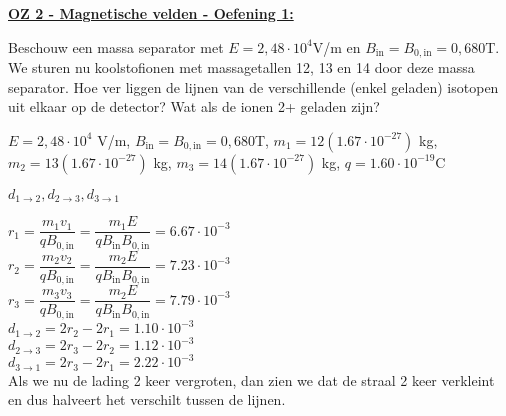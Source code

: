 \textbf{\underline{OZ 2 - Magnetische velden - Oefening 1:}}
\vspace{0.5cm}

Beschouw een massa separator met $E = 2, 48 \cdot 10^{4} $V/m en $B_{\text{in}} = B_{0,\text{in}} = 0,680 $T. We sturen nu koolstofionen met massagetallen 12, 13 en 14 door deze massa separator. Hoe ver liggen de lijnen van de verschillende (enkel geladen) isotopen uit elkaar op de detector? Wat als de ionen 2+ geladen zijn?

\begin{description}[labelwidth=1.5cm, leftmargin=!]
    \item[Geg. :]   $E = 2, 48 \cdot 10^{4} $ V/m, $B_{\text{in}} =         B_{0,\text{in}} = 0,680 $T, $ m_{1} = 12(1.67 \cdot 10^{-27})$ kg,
                    $ m_{2} = 13(1.67 \cdot 10^{-27})$ kg,
                    $ m_{3} = 14(1.67 \cdot 10^{-27})$ kg,
                    $q = 1.60 \cdot 10^{-19}$C
    \item[Gevr. :]  $d_{1 \to 2}, d_{2 \to 3}, d_{3 \to 1}$
    \item[Opl. :]  
                    $r_{1} = \dfrac{m_{1}v_{1}}{qB_{0,\text{in}}} =  \dfrac{m_{1}E}{qB_{\text{in}}B_{0,\text{in}}} = 6.67 \cdot 10^{-3}$ \vspace{0.3cm}\\
                    \hspace{0.57cm} $r_{2} = \dfrac{m_{2}v_{2}}{qB_{0,\text{in}}} =  \dfrac{m_{2}E}{qB_{\text{in}}B_{0,\text{in}}} = 7.23 \cdot 10^{-3}$ 
                    \vspace{0.3cm}\\
                    \hspace{0.57cm} $r_{3} = \dfrac{m_{3}v_{3}}{qB_{0,\text{in}}} =  \dfrac{m_{2}E}{qB_{\text{in}}B_{0,\text{in}}} = 7.79 \cdot 10^{-3}$ 
                    \vspace{0.3cm}\\
                    \hspace{0.57cm} $d_{1 \to 2} = 2r_{2} - 2r_{1} = 1.10 \cdot 10^{-3} $ 
                    \vspace{0.3cm}\\
                    \hspace{0.57cm} $d_{2 \to 3} = 2r_{3} - 2r_{2} = 1.12 \cdot 10^{-3} $ 
                    \vspace{0.3cm}\\
                    \hspace{0.57cm} $d_{3 \to 1} = 2r_{3} - 2r_{1} = 2.22 \cdot 10^{-3} $ 
                    \vspace{0.3cm}\\
                    Als we nu de lading 2 keer vergroten, dan zien we dat de straal 2 keer verkleint en dus halveert het verschilt tussen de lijnen. 

\end{description}

\vspace{1cm}